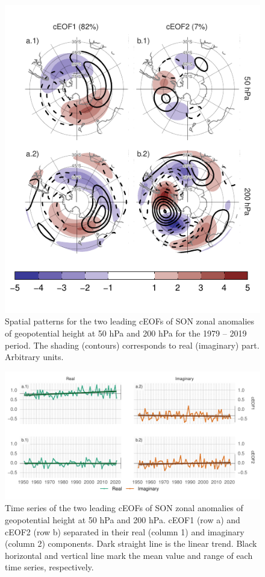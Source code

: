 \documentclass[smallextended]{svjour3}       %
\begin{document}
\begin{figure}
\centering
\includegraphics{../figures/ceofs-1-1.pdf}
\caption{\label{fig:ceofs-1}Spatial patterns for the two leading cEOFs of SON zonal anomalies of geopotential height at 50 hPa and 200 hPa for the 1979 -- 2019 period. The shading (contours) corresponds to real (imaginary) part. Arbitrary units.}
\end{figure}



\begin{figure}
\includegraphics{../figures/extended-series-1} \caption{Time series of the two leading cEOFs of SON zonal anomalies of geopotential height at 50 hPa and 200 hPa. cEOF1 (row a) and cEOF2 (row b) separated in their real (column 1) and imaginary (column 2) components. Dark straight line is the linear trend. Black horizontal and vertical line mark the mean value and range of each time series, respectively.}\label{fig:extended-series}
\end{figure}
\end{document}
